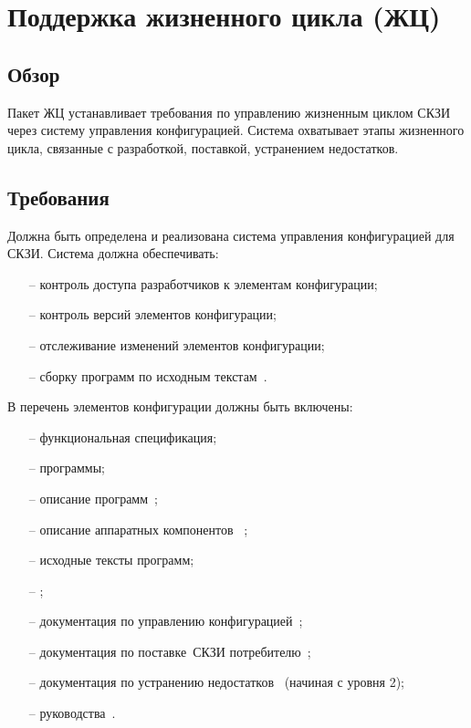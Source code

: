 \section{Поддержка жизненного цикла (ЖЦ)}\label{LC}

\subsection{Обзор}\label{LC.Intro}

Пакет ЖЦ устанавливает требования по управлению жизненным циклом СКЗИ
через систему управления конфигурацией. Система охватывает этапы жизненного 
цикла, связанные с разработкой, поставкой, устранением недостатков.

\subsection{Требования}\label{LC.Reqs}

\label{R.LC.CMSystem}
Должна быть определена и реализована система управления конфигурацией для СКЗИ.
Система должна обеспечивать:
\begin{itemize}
\item[--]
контроль доступа разработчиков к элементам конфигурации;
\item[--]
контроль версий элементов конфигурации;
\item[--]
отслеживание изменений элементов конфигурации;
\item[--]
сборку программ по исходным текстам~.
\end{itemize}

\label{R.LC.CMList}
В перечень элементов конфигурации должны быть включены:
\begin{itemize}
\item[--]
функциональная спецификация;
\item[--]
программы;
\item[--]
описание программ~;
\item[--]
описание аппаратных компонентов~
;
\item[--]
исходные тексты программ;
\item[--]
;
\item[--]
документация по управлению конфигурацией~;
\item[--]
документация по поставке~СКЗИ потребителю~;
\item[--]
документация по устранению недостатков~
(начиная с уровня 2);
\item[--]
руководства~.
\end{itemize}

